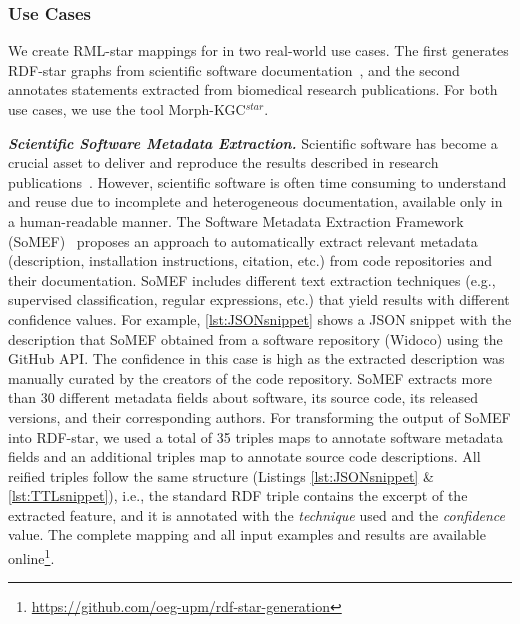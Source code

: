 \subsubsection{Use Cases}
\label{sec:chp4_star_usecases}

We create RML-star mappings for in two real-world use cases. 
The first generates \mbox{RDF-star} graphs from scientific software documentation~\parencite{iglesias2023fair-software-bp}, 
and the second annotates statements extracted from biomedical research publications. 
For both use cases, we use the tool \mbox{Morph-KGC$^{star}$}. 















\noindent\textbf{\textit{Scientific Software Metadata Extraction.}}
Scientific software has become a crucial asset to deliver and reproduce the results described in research publications~\parencite{chue_hong_fair_2021}. However, scientific software is often time consuming to understand and reuse due to incomplete and heterogeneous documentation, available only in a human-readable manner.
The Software Metadata Extraction Framework (SoMEF)~\parencite{somef} proposes an approach to automatically extract relevant metadata (description, installation instructions, citation, etc.) from code repositories and their documentation. SoMEF includes different text extraction techniques (e.g., supervised classification, regular expressions, etc.) that yield results with different confidence values.
For example, \cref{lst:JSONsnippet} shows a JSON snippet with the description that SoMEF obtained from a software repository (Widoco) using the GitHub API.
The confidence in this case is high as the extracted description was manually curated by the creators of the code repository.
SoMEF extracts more than 30 different metadata fields about 
software, its source code, its released versions, and their corresponding authors. For transforming the output of SoMEF into RDF-star, we used a total of 35 triples maps to annotate software metadata fields and an additional triples map to annotate source code descriptions. All reified triples follow the same structure (Listings \ref{lst:JSONsnippet} \& \ref{lst:TTLsnippet}), i.e., the standard RDF triple contains the excerpt of the extracted feature, and it is annotated
with the \emph{technique} used and the \emph{confidence} value. 
The complete mapping and all input examples and results are available online\footnote{\url{https://github.com/oeg-upm/rdf-star-generation}}.
 
